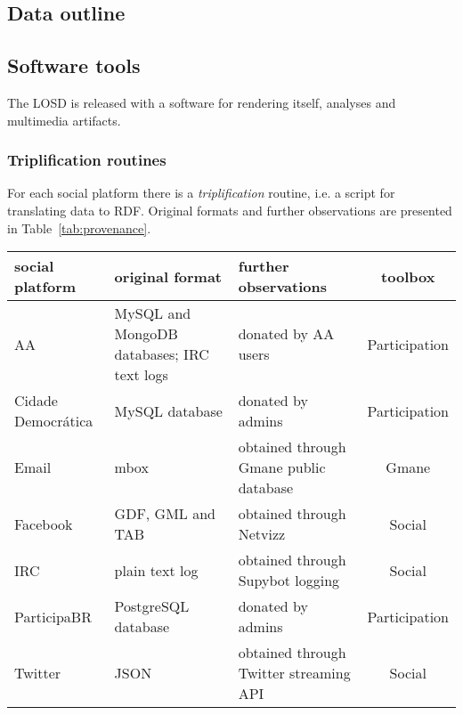 \documentclass[review]{elsarticle}
\begin{document}
\subsection{Data outline}




\subsection{Software tools}
The LOSD is released with a software for rendering itself, analyses and
multimedia artifacts.
\subsubsection{Triplification routines}
For each social platform there is a \emph{triplification} routine,
i.e. a script for translating data to RDF.
Original formats and further observations are presented in
Table~\ref{tab:provenance}.
\begin{table*}[h!]\scriptsize
\begin{center}
\caption{Social platforms, original formats and further observations for
the LOSD dataset.}\label{tab:provenance}
\begin{tabular}{| l || p{3cm} | p{3cm} | c |}\hline
    \textbf{social platform} & \textbf{original format} & \textbf{further observations} & \textbf{toolbox} \\\hline\hline
    AA & MySQL and MongoDB databases; IRC text logs & donated by AA users & Participation \\\hline
    Cidade Democrática & MySQL database & donated by admins & Participation \\\hline
    Email & mbox & obtained through Gmane public database & Gmane \\\hline
    Facebook & GDF, GML and TAB & obtained through Netvizz~\cite{netvizz} & Social \\\hline
    IRC & plain text log & obtained through Supybot logging & Social \\\hline
    ParticipaBR & PostgreSQL database & donated by admins & Participation \\\hline
    Twitter & JSON & obtained through Twitter streaming API & Social \\\hline
\end{tabular}\end{center}
\end{table*}                    
\end{document}
